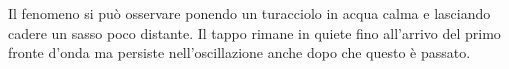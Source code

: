 \documentclass[10pt,a4paper,twoside,openright]{book}
\begin{document}
Il fenomeno si può osservare ponendo un turacciolo in acqua calma e lasciando cadere un sasso poco distante. Il tappo rimane in quiete fino all'arrivo del primo fronte d'onda ma persiste nell'oscillazione anche dopo che questo è passato.
\end{document}
